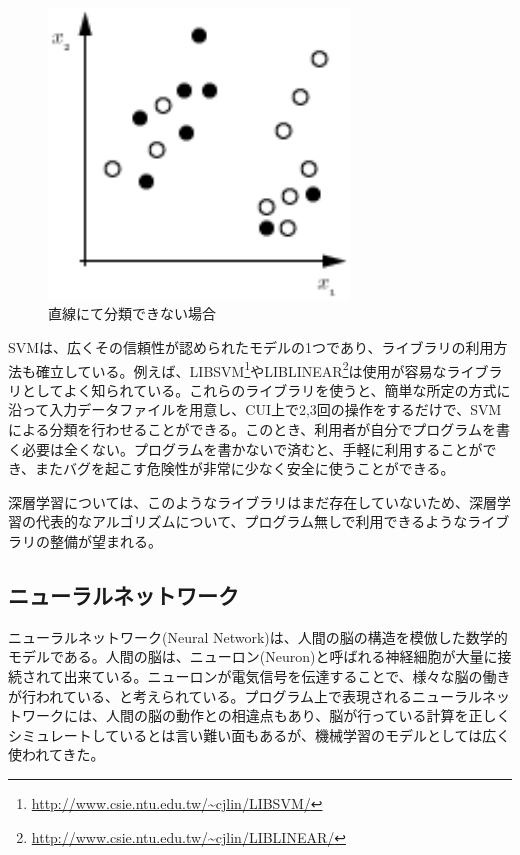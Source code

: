 \begin{figure}[tbp]
 \centering
  \includegraphics[width=80mm]{img/c2/svm_mixed}
 \caption{直線にて分類できない場合}
 \label{c2_svm_mixed}
\end{figure}
SVMは、広くその信頼性が認められたモデルの1つであり、ライブラリの利用方法も確立している。例えば、LIBSVM\footnote{\url{http://www.csie.ntu.edu.tw/~cjlin/LIBSVM/}}やLIBLINEAR\footnote{\url{http://www.csie.ntu.edu.tw/~cjlin/LIBLINEAR/}}は使用が容易なライブラリとしてよく知られている。これらのライブラリを使うと、簡単な所定の方式に沿って入力データファイルを用意し、CUI上で2,3回の操作をするだけで、SVMによる分類を行わせることができる。このとき、利用者が自分でプログラムを書く必要は全くない。プログラムを書かないで済むと、手軽に利用することができ、またバグを起こす危険性が非常に少なく安全に使うことができる。\par
深層学習については、このようなライブラリはまだ存在していないため、深層学習の代表的なアルゴリズムについて、プログラム無しで利用できるようなライブラリの整備が望まれる。
\subsection{ニューラルネットワーク}
ニューラルネットワーク(Neural Network)は、人間の脳の構造を模倣した数学的モデルである。人間の脳は、ニューロン(Neuron)と呼ばれる神経細胞が大量に接続されて出来ている。ニューロンが電気信号を伝達することで、様々な脳の働きが行われている、と考えられている。プログラム上で表現されるニューラルネットワークには、人間の脳の動作との相違点もあり、脳が行っている計算を正しくシミュレートしているとは言い難い面もある\cite{chuanrenguangnan1998naonojisuanlilun}が、機械学習のモデルとしては広く使われてきた。\par

